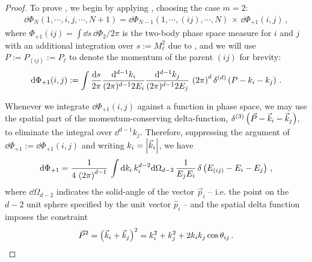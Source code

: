 \begin{proof}
    To prove , we begin by applying , choosing the case \(m=2\):
    \begin{align}
        \dd \Phi_{N}(1, \cdots, i, j, \cdots, N+1)
        =
        \dd \Phi_{N-1}(1, \cdots, (ij), \cdots, N)
        \,
        \times
        \,
        \dd\Phi_{+1}(i,j)
        \,,
    \end{align}
    where \(\Phi_{+1}(ij) = \int \dd s \, \dd \Phi_2 / 2\pi\) is the two-body phase space measure for \(i\) and \(j\) with an additional integration over \(s := M_\ell^2\) due to , and we will use \(P := P_{(ij)} := P_\ell\) to denote the momentum of the parent \((ij)\) for brevity:
    \begin{align}
        \dd \Phi_{+1}(i,j)
        :=
        \int \frac{\dd s}{2\pi}
        \frac{\dd^{d-1} k_i}{(2\pi)^{d-1} 2 E_i}
        \frac{\dd^{d-1} k_j}{(2\pi)^{d-1} 2 E_j}
        \,
        \left(2\pi\right)^d \delta^{(d)}\left(P - k_i - k_j\right)
        \,.
    \end{align}


    Whenever we integrate \(\dd \Phi_{+1}(i, j)\) against a function in phase space, we may use the spatial part of the momentum-conserving delta-function, \(\delta^{(3)}\left(\vec{P} - \vec{k}_i - \vec{k}_j\right)\), to eliminate the integral over \(\dd^{d-1} k_j\).
    Therefore, suppressing the argument of \(\dd \Phi_{+1} := \dd \Phi_{+1}(i, j)\) and writing \(k_i = \abs{\vec{k}_i}\), we have
    \begin{align}
        \dd \Phi_{+1}
        =
        \frac{1}{4\,\left(2\pi\right)^{d-1}}
        \,
        \int
        \dd k_i \, k_i^{d-2} \dd\Omega_{d-2}
        \,
        \frac{1}{E_j E_i}
        \,
        \delta\left(E_{(ij)} - E_i - E_j\right)
        \,,
    \end{align}
    where \(\dd \Omega_{d-2}\) indicates the solid-angle of the vector \(\vec{p}_i\) -- i.e. the point on the \(d-2\) unit sphere specified by the unit vector \(\hat{p}_i\) -- and the spatial delta function imposes the constraint
    \begin{align}
        \vec{P}^2 = \left(\vec{k}_i + \vec{k}_j\right)^2
        =
        k_i^2 + k_j^2 + 2 k_i k_j \cos\theta_{ij}
        \,.
    \end{align}


\end{proof}
